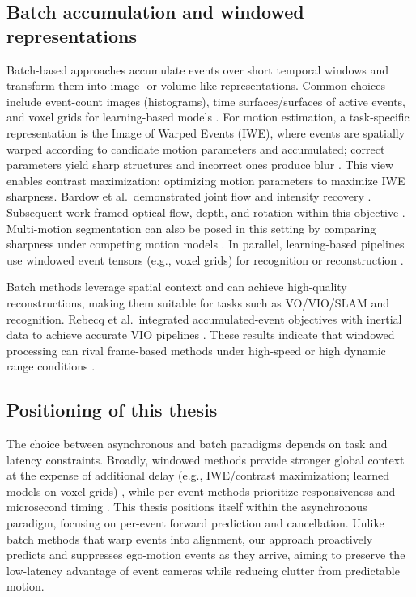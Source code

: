 \subsection{Batch accumulation and windowed representations}
Batch-based approaches accumulate events over short temporal windows and transform them into image- or volume-like representations. Common choices include event-count images (histograms), time surfaces/surfaces of active events, and voxel grids for learning-based models \cite{Gallego2020Survey}. For motion estimation, a task-specific representation is the Image of Warped Events (IWE), where events are spatially warped according to candidate motion parameters and accumulated; correct parameters yield sharp structures and incorrect ones produce blur \cite{Gallego2018CMax}. This view enables contrast maximization: optimizing motion parameters to maximize IWE sharpness. Bardow et al.\ demonstrated joint flow and intensity recovery \cite{Bardow2016SOFIE}. Subsequent work framed optical flow, depth, and rotation within this objective \cite{Gallego2018CMax}. Multi-motion segmentation can also be posed in this setting by comparing sharpness under competing motion models \cite{Stoffregen2019Segmentation}. In parallel, learning-based pipelines use windowed event tensors (e.g., voxel grids) for recognition or reconstruction \cite{Rebecq2019E2VID,Gallego2020Survey}.

Batch methods leverage spatial context and can achieve high-quality reconstructions, making them suitable for tasks such as VO/VIO/SLAM and recognition. Rebecq et al.\ integrated accumulated-event objectives with inertial data to achieve accurate VIO pipelines \cite{Rebecq2017EVO,Rebecq2019E2VID}. These results indicate that windowed processing can rival frame-based methods under high-speed or high dynamic range conditions \cite{Gallego2020Survey}.

\subsection{Positioning of this thesis}
The choice between asynchronous and batch paradigms depends on task and latency constraints. Broadly, windowed methods provide stronger global context at the expense of additional delay (e.g., IWE/contrast maximization; learned models on voxel grids) \cite{Gallego2018CMax,Bardow2016SOFIE,Stoffregen2019Segmentation,Rebecq2017EVO,Rebecq2019E2VID}, while per-event methods prioritize responsiveness and microsecond timing \cite{Gallego2020Survey}. This thesis positions itself within the asynchronous paradigm, focusing on per-event forward prediction and cancellation. Unlike batch methods that warp events into alignment, our approach proactively predicts and suppresses ego-motion events as they arrive, aiming to preserve the low-latency advantage of event cameras while reducing clutter from predictable motion.

